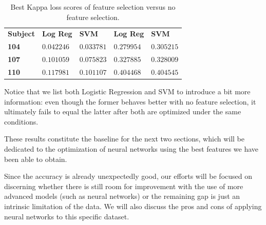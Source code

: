 	\vspace{0.3cm}

    \begin{table}[h]

        \centering
        \setlength\arrayrulewidth{0.8pt}

        \begin{tabular}{| >{\centering\arraybackslash}m{0.7in} | >{\centering\arraybackslash}m{0.7in} | >{\centering\arraybackslash}m{0.7in} | >{\centering\arraybackslash}m{0.7in} | >{\centering\arraybackslash}m{0.7in} |}

			\hline
			\rowcolor{RoyalBlue}
			 & \multicolumn{2}{|c|}{\textbf{Feature selection}} & \multicolumn{2}{|c|}{\textbf{No feature selection}} \\
			\hline
            \rowcolor{RoyalBlue}
            \textbf{Subject} & \textbf{Log Reg} & \textbf{SVM} & \textbf{Log Reg} & \textbf{SVM} \\
            \hline
            \cellcolor{RoyalBlue}\textbf{104} & $0.042246$ & $0.033781$ & $0.279954$ & $0.305215$ \\
            \hline
            \cellcolor{RoyalBlue}\textbf{107} & $0.101059$ & $0.075823$ & $0.327885$ & $0.328009$ \\
            \hline
            \cellcolor{RoyalBlue}\textbf{110} & $0.117981$ & $0.101107$ & $0.404468$ & $0.404545$ \\
            \hline

        \end{tabular}

        \caption{Best Kappa loss scores of feature selection versus no feature selection.}\label{table:feature_selection_comparison}

    \end{table}

    Notice that we list both Logistic Regression and \acs{SVM} to introduce a bit more information: even though the former behaves better with no feature selection, it ultimately fails to equal the latter after both are optimized under the same conditions.

    These results constitute the baseline for the next two sections, which will be dedicated to the optimization of neural networks using the best features we have been able to obtain.

    Since the accuracy is already unexpectedly good, our efforts will be focused on discerning whether there is still room for improvement with the use of more advanced models (such as neural networks) or the remaining gap is just an intrinsic limitation of the data. We will also discuss the pros and cons of applying neural networks to this specific dataset.

